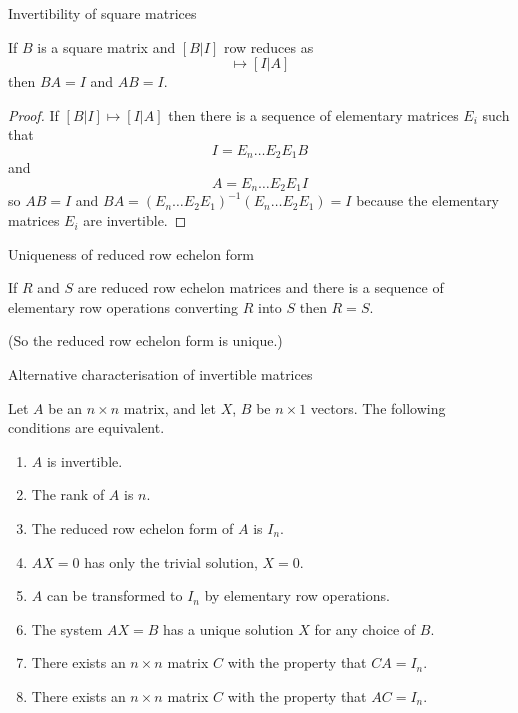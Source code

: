 \documentclass{beamer}
\begin{document}
\begin{frame}{Invertibility of square matrices}
  \begin{theorem}
    If $B$ is a square matrix and $[B|I]$ row reduces as
    \begin{equation*}
      [B|I] \mapsto [I|A]
    \end{equation*}
    then $BA=I$ and $AB=I$.    
    \begin{proof}
      If $[B|I]\mapsto [I|A]$ then there is a sequence of elementary matrices $E_i$ such that
      \begin{equation*}
        I = E_n\dots E_2E_1B
      \end{equation*}
      and
      \begin{equation*}
        A = E_n\dots E_2E_1I
      \end{equation*}
      so $AB=I$ and $BA = (E_n\dots E_2E_1)^{-1}(E_n\dots E_2E_1) = I$ because the elementary matrices $E_i$ are invertible.
    \end{proof}
  \end{theorem}
\end{frame}

\begin{frame}{Uniqueness of reduced row echelon form}
  \begin{theorem}
    If $R$ and $S$ are reduced row echelon matrices and there is a sequence of elementary row operations converting $R$ into $S$ then $R=S$.
  \end{theorem}\vfill
  (So the reduced row echelon form is unique.)
\end{frame}

\begin{frame}{Alternative characterisation of invertible matrices}
  \begin{theorem}
    Let $A$ be an $n\times n$ matrix, and
    let $X$, $B$ be $n \times 1$ vectors.
    The following conditions are equivalent.
    \begin{enumerate}
    \item $A$ is invertible.
    \item The rank of $A$ is $n$. 
    \item The reduced row echelon form of $A$ is $I_n$.
    \item $AX=0$ has only the trivial solution, $X=0$.
    \item $A$ can be transformed to $I_n$ by elementary row operations.
    \item
      The system $AX=B$ has a unique solution $X$ for any
      choice of $B$.
    \item
      There exists an $n\times n$ matrix $C$ with the property that $CA=I_n$.
    \item
      There exists an $n\times n$ matrix $C$ with the property that $AC=I_n$.
    \end{enumerate}
  \end{theorem}
\end{frame}
\end{document}

